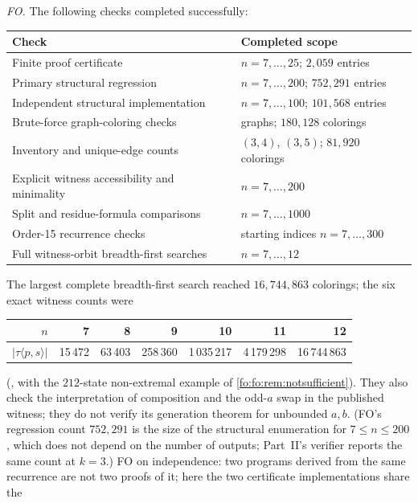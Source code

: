 \documentclass[11pt,a4paper]{article}
\numberwithin{equation}{section}
\theoremstyle{definition}
\theoremstyle{remark}
\begin{document}
\emph{FO.} The following checks completed successfully:
\begin{center}
\small
\begin{tabular}{@{}>{\raggedright}p{}>{\raggedright\arraybackslash}p{}@{}}
\toprule
Check & Completed scope\\
\midrule
Finite proof certificate & $n=7,\ldots,25$; $2{,}059$ entries\\
Primary structural regression & $n=7,\ldots,200$; $752{,}291$ entries\\
Independent structural implementation & $n=7,\ldots,100$; $101{,}568$ entries\\
Brute-force graph-coloring checks & 17 graphs; $180{,}128$ colorings\\
Inventory and unique-edge counts & $(3,4)$, $(3,5)$; $81{,}920$ colorings\\
Explicit witness accessibility and minimality & $n=7,\ldots,200$\\
Split and residue-formula comparisons & $n=7,\ldots,1000$\\
Order-15 recurrence checks & starting indices $n=7,\ldots,300$\\
Full witness-orbit breadth-first searches & $n=7,\ldots,12$\\
\bottomrule
\end{tabular}
\end{center}
The largest complete breadth-first search reached $16{,}744{,}863$ colorings;
the six exact witness counts were
\begin{center}
\small
\begin{tabular}{@{}rrrrrrr@{}}
\toprule
$n$ & 7 & 8 & 9 & 10 & 11 & 12\\
\midrule
$|\tau\langle p,s\rangle|$ & 15\,472 & 63\,403 & 258\,360 & 1\,035\,217 & 4\,179\,298 & 16\,744\,863\\
\bottomrule
\end{tabular}
\end{center}
(, with the $212$-state non-extremal example
of \cref{fo:fo:rem:notsufficient}). They also check the interpretation of
composition and the odd-$a$ swap in the published witness; they do not verify
its generation theorem for unbounded $a,b$. (FO's regression count $752{,}291$
is the size of the structural enumeration for $7\le n\le200$, which does not
depend on the number of outputs; Part~II's verifier reports the same count at
$k=3$.) FO on independence: two programs derived from the same recurrence are
not two proofs of it; here the two certificate implementations share the
\end{document}
